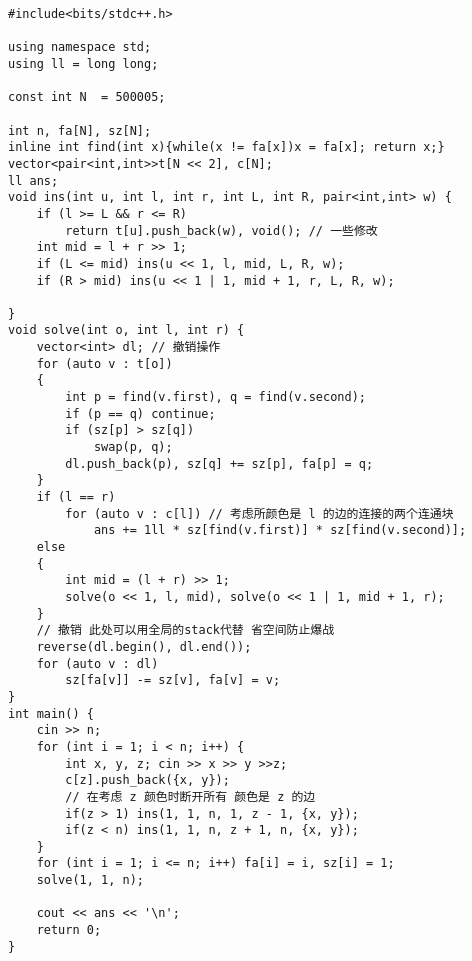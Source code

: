 \begin{verbatim}
#include<bits/stdc++.h>

using namespace std;
using ll = long long;

const int N  = 500005;

int n, fa[N], sz[N];
inline int find(int x){while(x != fa[x])x = fa[x]; return x;}
vector<pair<int,int>>t[N << 2], c[N];
ll ans;
void ins(int u, int l, int r, int L, int R, pair<int,int> w) {
    if (l >= L && r <= R)
        return t[u].push_back(w), void(); // 一些修改
    int mid = l + r >> 1;
    if (L <= mid) ins(u << 1, l, mid, L, R, w);
    if (R > mid) ins(u << 1 | 1, mid + 1, r, L, R, w);

}
void solve(int o, int l, int r) {
    vector<int> dl; // 撤销操作
    for (auto v : t[o])
    {
        int p = find(v.first), q = find(v.second);
        if (p == q) continue;
        if (sz[p] > sz[q])
            swap(p, q);
        dl.push_back(p), sz[q] += sz[p], fa[p] = q;
    }
    if (l == r)
        for (auto v : c[l]) // 考虑所颜色是 l 的边的连接的两个连通块
            ans += 1ll * sz[find(v.first)] * sz[find(v.second)];
    else
    {
        int mid = (l + r) >> 1;
        solve(o << 1, l, mid), solve(o << 1 | 1, mid + 1, r);
    }
    // 撤销 此处可以用全局的stack代替 省空间防止爆战
    reverse(dl.begin(), dl.end());
    for (auto v : dl)
        sz[fa[v]] -= sz[v], fa[v] = v;
}
int main() {
    cin >> n;
    for (int i = 1; i < n; i++) {
        int x, y, z; cin >> x >> y >>z;
        c[z].push_back({x, y});
        // 在考虑 z 颜色时断开所有 颜色是 z 的边
        if(z > 1) ins(1, 1, n, 1, z - 1, {x, y});
        if(z < n) ins(1, 1, n, z + 1, n, {x, y});
    }
    for (int i = 1; i <= n; i++) fa[i] = i, sz[i] = 1;
    solve(1, 1, n);
    
    cout << ans << '\n';
    return 0;
}
\end{verbatim}

